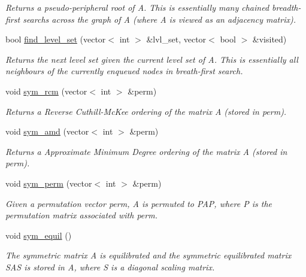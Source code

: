 \begin{DoxyCompactItemize}
\begin{DoxyCompactList}\small\item\em Returns a pseudo-\/peripheral root of A. This is essentially many chained breadth-\/first searchs across the graph of A (where A is viewed as an adjacency matrix). \end{DoxyCompactList}\item 
bool \hyperlink{classlilc__matrix_ad343cd9b2f435f40a9866de050f63ce5}{find\+\_\+level\+\_\+set} (vector$<$ int $>$ \&lvl\+\_\+set, vector$<$ bool $>$ \&visited)
\begin{DoxyCompactList}\small\item\em Returns the next level set given the current level set of A. This is essentially all neighbours of the currently enqueued nodes in breath-\/first search. \end{DoxyCompactList}\item 
void \hyperlink{classlilc__matrix_ab34914d2b48a5bf14e7ef22e89d2f2e7}{sym\+\_\+rcm} (vector$<$ int $>$ \&perm)
\begin{DoxyCompactList}\small\item\em Returns a Reverse Cuthill-\/\+Mc\+Kee ordering of the matrix A (stored in perm). \end{DoxyCompactList}\item 
void \hyperlink{classlilc__matrix_add59bf538bd6b36c7d42ec879bad4da8}{sym\+\_\+amd} (vector$<$ int $>$ \&perm)
\begin{DoxyCompactList}\small\item\em Returns a Approximate Minimum Degree ordering of the matrix A (stored in perm). \end{DoxyCompactList}\item 
void \hyperlink{classlilc__matrix_af72f55f6880cef04205eb3df7018bce9}{sym\+\_\+perm} (vector$<$ int $>$ \&perm)
\begin{DoxyCompactList}\small\item\em Given a permutation vector perm, A is permuted to P\textquotesingle{}AP, where P is the permutation matrix associated with perm. \end{DoxyCompactList}\item 
void \hyperlink{classlilc__matrix_a37fc8dcc40799dfde0decaaf8bd74b51}{sym\+\_\+equil} ()
\begin{DoxyCompactList}\small\item\em The symmetric matrix A is equilibrated and the symmetric equilibrated matrix S\+AS is stored in A, where S is a diagonal scaling matrix. \end{DoxyCompactList}\item 

\end{DoxyCompactItemize}
